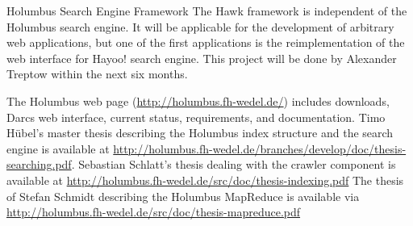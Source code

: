 \begin{hcarentry}[updated]{Holumbus Search Engine Framework}
The Hawk framework is independent of the Holumbus search engine.
It will be applicable for the development of arbitrary web applications,
but one of the first applications is the reimplementation of the web interface
for Hayoo! search engine. This project will be done by Alexander Treptow within
the next six months.

\FurtherReading

The Holumbus web page
(\url{http://holumbus.fh-wedel.de/})
includes downloads, Darcs web interface, current status, requirements, 
and documentation.
Timo H\"ubel's master thesis describing the Holumbus index structure and
the search engine is available at
\url{http://holumbus.fh-wedel.de/branches/develop/doc/thesis-searching.pdf}.
Sebastian Schlatt's thesis dealing with the crawler component is
available at
\url{http://holumbus.fh-wedel.de/src/doc/thesis-indexing.pdf}
The thesis of Stefan Schmidt describing the Holumbus MapReduce is
available via \url{http://holumbus.fh-wedel.de/src/doc/thesis-mapreduce.pdf}
\end{hcarentry}
